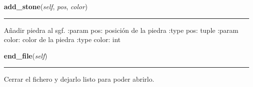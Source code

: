     \label{src:kifu:Kifu:add_stone}

    \vspace{0.5ex}

\hspace{.8\funcindent}\begin{boxedminipage}{\funcwidth}

    \raggedright \textbf{add\_stone}(\textit{self}, \textit{pos}, \textit{color})

    \vspace{-1.5ex}

    \rule{\textwidth}{0.5\fboxrule}
\setlength{\parskip}{2ex}

Añadir piedra al sgf.
:param pos: posición de la piedra
:type pos: tuple
:param color: color de la piedra
:type color: int
\setlength{\parskip}{1ex}
    \end{boxedminipage}

    \label{src:kifu:Kifu:end_file}

    \vspace{0.5ex}

\hspace{.8\funcindent}\begin{boxedminipage}{\funcwidth}

    \raggedright \textbf{end\_file}(\textit{self})

    \vspace{-1.5ex}

    \rule{\textwidth}{0.5\fboxrule}
\setlength{\parskip}{2ex}

Cerrar el fichero y dejarlo listo para poder abrirlo.
\setlength{\parskip}{1ex}
    \end{boxedminipage}

